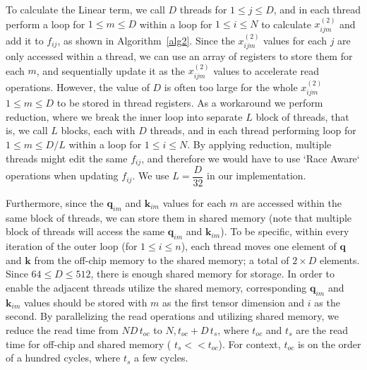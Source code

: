 \par To calculate the Linear term, we call $D$ threads for $1\leq j\leq D$, and in each thread perform a loop for $1\leq m\leq D$ within a loop for $1\leq i\leq N$ to calculate $x^{(2)}_{ijm}$ and add it to $f_{ij}$, as shown in Algorithm~\ref{alg2}. Since the $x^{(2)}_{ijm}$ values for each $j$ are only accessed within a thread, we can use an array of registers to store them for each $m$, and sequentially update it as the $x^{(2)}_{ijm}$ values to accelerate read operations. However, the value of $D$ is often too large for the whole $x^{(2)}_{ijm}$ $1\leq m\leq D$ to be stored in thread registers. As a workaround we perform reduction, where we break the inner loop into separate $L$ block of threads, that is, we call $L$ blocks, each with $D$ threads, and in each thread performing loop for $1\leq m\leq D/L$ within a loop for $1\leq i\leq N$. By applying reduction, multiple threads might edit the same $f_{ij}$, and therefore we would have to use `Race Aware` operations when updating $f_{ij}$. We use $L=\dfrac{D}{32}$ in our implementation.

\par Furthermore, since the $\mathbf{q}_{im}$ and $\mathbf{k}_{im}$ values for each $m$ are accessed within the same block of threads, we can store them in shared memory (note that multiple block of threads will access the same $\mathbf{q}_{im}$ and $\mathbf{k}_{im}$). To be specific, within every iteration of the outer loop (for $1\leq i\leq n$), each thread moves one element of $\mathbf{q}$ and $\mathbf{k}$ from the off-chip memory to the shared memory; a total of $2\times D$ elements. Since $64\leq D\leq 512$, there is enough shared memory for storage. In order to enable the adjacent threads utilize the shared memory, corresponding $\mathbf{q}_{im}$ and $\mathbf{k}_{im}$ values should be stored with $m$ as the first tensor dimension and $i$ as the second. By parallelizing the read operations and utilizing shared memory, we reduce the read time from $ND\,t_{oc}$ to $N,t_{oc} + D\,t_{s}$, where $t_{oc}$ and $t_{s}$ are the read time for off-chip and shared memory ( $t_{s}<< t_{oc}$). For context, $t_{oc}$ is on the order of a hundred cycles, where $t_{s}$ a few cycles.


